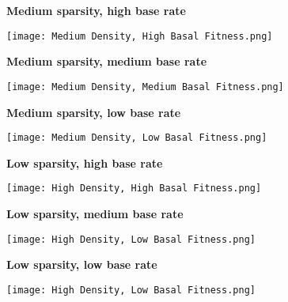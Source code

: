 \documentclass[11pt]{article}
\begin{document}
\begin{figure}[H]
            \centering
            \textbf{Medium sparsity, high base rate}\par
            \texttt{[image: Medium Density, High Basal Fitness.png]}
            \caption{}
\end{figure}
\begin{figure}[H]
            \centering
            \textbf{Medium sparsity, medium base rate}\par
            \texttt{[image: Medium Density, Medium Basal Fitness.png]}
            \caption{}
\end{figure}
\begin{figure}[H]
            \centering
            \textbf{Medium sparsity, low base rate}\par
            \texttt{[image: Medium Density, Low Basal Fitness.png]}
            \caption{}        
\end{figure}
\begin{figure}[H]
            \centering
            \textbf{Low sparsity, high base rate}\par
            \texttt{[image: High Density, High Basal Fitness.png]}
            \caption{}
\end{figure}
\begin{figure}[H]
            \centering
            \textbf{Low sparsity, medium base rate}\par
            \texttt{[image: High Density, Low Basal Fitness.png]}
            \caption{}
\end{figure}
\begin{figure}[H]
            \centering
            \textbf{Low sparsity, low base rate}\par
            \texttt{[image: High Density, Low Basal Fitness.png]}
            \caption{}        
\end{figure}
\end{document}
